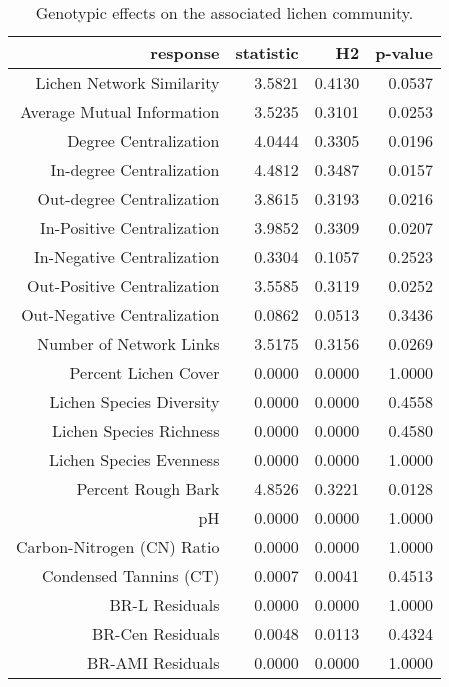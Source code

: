 \begin{table}[ht]
\centering
\begin{tabular}{rrrr}
  \hline
response & statistic & H2 & p-value \\ 
  \hline
Lichen Network Similarity & 3.5821 & 0.4130 & 0.0537 \\ 
  Average Mutual Information & 3.5235 & 0.3101 & 0.0253 \\ 
  Degree Centralization & 4.0444 & 0.3305 & 0.0196 \\ 
  In-degree Centralization & 4.4812 & 0.3487 & 0.0157 \\ 
  Out-degree Centralization & 3.8615 & 0.3193 & 0.0216 \\ 
  In-Positive Centralization & 3.9852 & 0.3309 & 0.0207 \\ 
  In-Negative Centralization & 0.3304 & 0.1057 & 0.2523 \\ 
  Out-Positive Centralization & 3.5585 & 0.3119 & 0.0252 \\ 
  Out-Negative Centralization & 0.0862 & 0.0513 & 0.3436 \\ 
  Number of Network Links & 3.5175 & 0.3156 & 0.0269 \\ 
  Percent Lichen Cover & 0.0000 & 0.0000 & 1.0000 \\ 
  Lichen Species Diversity & 0.0000 & 0.0000 & 0.4558 \\ 
  Lichen Species Richness & 0.0000 & 0.0000 & 0.4580 \\ 
  Lichen Species Evenness & 0.0000 & 0.0000 & 1.0000 \\ 
  Percent Rough Bark & 4.8526 & 0.3221 & 0.0128 \\ 
  pH & 0.0000 & 0.0000 & 1.0000 \\ 
  Carbon-Nitrogen (CN) Ratio & 0.0000 & 0.0000 & 1.0000 \\ 
  Condensed Tannins (CT) & 0.0007 & 0.0041 & 0.4513 \\ 
  BR-L Residuals & 0.0000 & 0.0000 & 1.0000 \\ 
  BR-Cen Residuals & 0.0048 & 0.0113 & 0.4324 \\ 
  BR-AMI Residuals & 0.0000 & 0.0000 & 1.0000 \\ 
   \hline
\end{tabular}
\caption{Genotypic effects on the associated lichen community.} 
\label{tab:h2_table}
\end{table}
